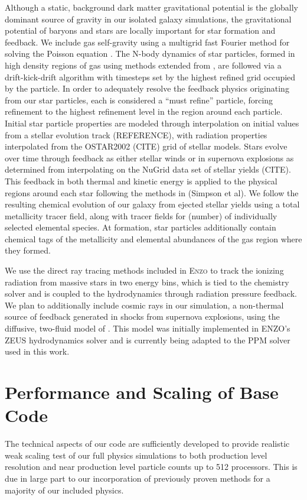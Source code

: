 \documentclass[12pt]{article}
\begin{document}
Although a static, background dark matter gravitational potential is the globally dominant source of gravity in our isolated galaxy simulations, the gravitational potential of baryons and stars are locally important for star formation and feedback. We include gas self-gravity using a multigrid fast Fourier method for solving the Poisson equation . The N-body dynamics of star particles, formed in high density regions of gas using methods extended from \cite{Goldbaum}, are followed via a drift-kick-drift algorithm \citep{HickneyEastwood1988} with timesteps set by the highest refined grid occupied by the particle. In order to adequately resolve the feedback physics originating from our star particles, each is considered a ``must refine'' particle, forcing refinement to the highest refinement level in the region around each particle. Initial star particle properties are modeled through interpolation on initial values from a stellar evolution track (REFERENCE), with radiation properties interpolated from the OSTAR2002 (CITE) grid of stellar models. Stars evolve over time through feedback as either stellar winds or in supernova explosions as determined from interpolating on the NuGrid data set of stellar yields (CITE). This feedback in both thermal and kinetic energy is applied to the physical regions around each star following the methods in (Simpson et al). We follow the resulting chemical evolution of our galaxy from ejected stellar yields using a total metallicity tracer field, along with tracer fields for (number) of individually selected elemental species. At formation, star particles additionally contain chemical tags of the metallicity and elemental abundances of the gas region where they formed.

We use the direct ray tracing methods included in \textsc{Enzo} to track the ionizing radiation from massive stars in two energy bins, which is tied to the chemistry solver and is coupled to the hydrodynamics through radiation pressure feedback. We plan to additionally include cosmic rays in our simulation, a non-thermal source of feedback generated in shocks from supernova explosions, using the diffusive, two-fluid model of \cite{Salem}. This model was initially implemented in \textsc{ENZO}'s ZEUS hydrodynamics solver and is currently being adapted to the PPM solver used in this work. 

\section{Performance and Scaling of Base Code}

The technical aspects of our code are sufficiently developed to provide realistic weak scaling test of our full physics simulations to both production level resolution and near production level particle counts up to 512 processors. This is due in large part to our incorporation of previously proven methods for a majority of our included physics. 



\end{document}
